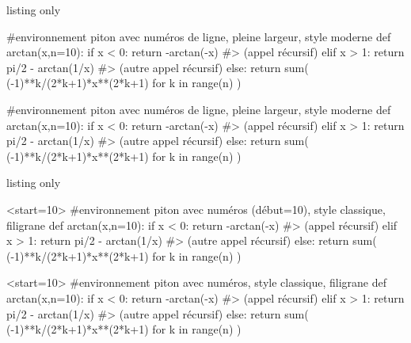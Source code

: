 \documentclass[a4paper,french,11pt]{article}
\begin{document}
\begin{PresCodeTexPL}{listing only}
\begin{CodePiton}{} %
#environnement piton avec numéros de ligne, pleine largeur, style moderne
def arctan(x,n=10):
	if x < 0:
		return -arctan(-x) #> (appel récursif)
	elif x > 1:
		return pi/2 - arctan(1/x) #> (autre appel récursif)
	else:
		return sum( (-1)**k/(2*k+1)*x**(2*k+1) for k in range(n) )
\end{CodePiton}
\end{PresCodeTexPL}

\begin{CodePiton}{}
#environnement piton avec numéros de ligne, pleine largeur, style moderne
def arctan(x,n=10):
	if x < 0:
		return -arctan(-x) #> (appel récursif)
	elif x > 1:
		return pi/2 - arctan(1/x) #> (autre appel récursif)
	else:
		return sum( (-1)**k/(2*k+1)*x**(2*k+1) for k in range(n) )
\end{CodePiton}

\begin{PresCodeTexPL}{listing only}
\begin{CodePiton}[Style=Classique,Filigrane]{}<start=10>
#environnement piton avec numéros (début=10), style classique, filigrane
def arctan(x,n=10):
	if x < 0:
		return -arctan(-x) #> (appel récursif)
	elif x > 1:
		return pi/2 - arctan(1/x) #> (autre appel récursif)
	else:
		return sum( (-1)**k/(2*k+1)*x**(2*k+1) for k in range(n) )
\end{CodePiton}
\end{PresCodeTexPL}

\begin{CodePiton}[Style=Classique,Filigrane]{}<start=10>
#environnement piton avec numéros, style classique, filigrane
def arctan(x,n=10):
	if x < 0:
		return -arctan(-x) #> (appel récursif)
	elif x > 1:
		return pi/2 - arctan(1/x) #> (autre appel récursif)
	else:
		return sum( (-1)**k/(2*k+1)*x**(2*k+1) for k in range(n) )
\end{CodePiton}
\end{document}
